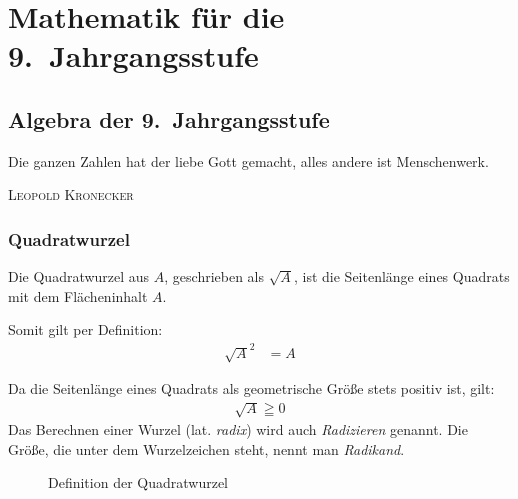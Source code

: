 \part{Mathematik für die 9.~Jahrgangsstufe}

\chapter{Algebra der 9.~Jahrgangsstufe}
\label{ch:new}
\epigraph{Die ganzen Zahlen hat der liebe Gott gemacht, alles andere ist Menschenwerk.}{\textsc{Leopold Kronecker}}

\section{Quadratwurzel}
\label{sec:qwurzel}

\begin{defi}[Quadratwurzel]
 Die Quadratwurzel aus \(A\), geschrieben als \(\sqrt{A}\), ist die Seitenlänge eines Quadrats mit dem Flächeninhalt \(A\).
 
 Somit gilt per Definition:
 \begin{align*}
  \sqrt{A}^2 &= A
 \end{align*}

 Da die Seitenlänge eines Quadrats als geometrische Größe stets positiv ist, gilt:\begin{align*}
                                                                                   \sqrt{A} \geqq 0
                                                                                  \end{align*}
 Das Berechnen einer Wurzel (lat. \emph{radix}) wird auch \emph{Radizieren} genannt. Die Größe, die unter dem Wurzelzeichen steht, nennt man \emph{Radikand}.
 \begin{figure}\begin{center}
               \end{center}
\caption{Definition der Quadratwurzel}
\end{figure}
 
 \end{defi}


